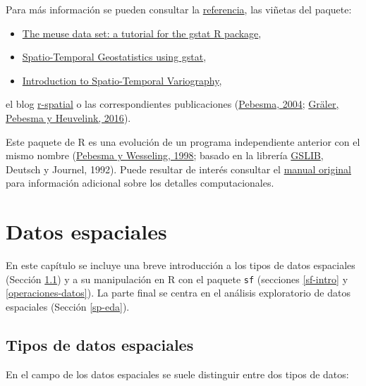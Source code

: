 \documentclass[
  spanish,
]{book}
\providecommand{\tightlist}{%
  \setlength{\itemsep}{0pt}\setlength{\parskip}{0pt}}
\theoremstyle{break}
\theoremstyle{definition}
\theoremstyle{definition}
\theoremstyle{definition}
\theoremstyle{definition}
\theoremstyle{remark}
\begin{document}
Para más información se pueden consultar la \href{https://r-spatial.github.io/gstat/reference/index.html}{referencia}, las viñetas del paquete:

\begin{itemize}
\tightlist
\item
  \href{https://cran.r-project.org/web/packages/gstat/vignettes/gstat.pdf}{The meuse data set: a tutorial for the gstat R package},
\item
  \href{https://cran.r-project.org/web/packages/gstat/vignettes/spatio-temporal-kriging.pdf}{Spatio-Temporal Geostatistics using gstat},
\item
  \href{https://cran.r-project.org/web/packages/gstat/vignettes/st.pdf}{Introduction to Spatio-Temporal Variography},
\end{itemize}

el blog \href{https://r-spatial.org/}{r-spatial} o las correspondientes publicaciones (\href{http://www.sciencedirect.com/science/article/pii/S0098300404000676}{Pebesma, 2004}; \href{https://journal.r-project.org/archive/2016-1/na-pebesma-heuvelink.pdf}{Gräler, Pebesma y Heuvelink, 2016}).

Este paquete de R es una evolución de un programa independiente anterior con el mismo nombre (\href{http://www.sciencedirect.com/science/article/pii/S0098300497000824}{Pebesma y Wesseling, 1998}; basado en la librería \href{http://www.gslib.com}{GSLIB}, Deutsch y Journel, 1992).
Puede resultar de interés consultar el \href{http://www.gstat.org/gstat.pdf}{manual original} para información adicional sobre los detalles computacionales.

\hypertarget{datos}{%
\chapter{Datos espaciales}\label{datos}}

En este capítulo se incluye una breve introducción a los tipos de datos espaciales (Sección \ref{datos-tipos}) y a su manipulación en R con el paquete \texttt{sf} (secciones \ref{sf-intro} y \ref{operaciones-datos}).
La parte final se centra en el análisis exploratorio de datos espaciales (Sección \ref{sp-eda}).

\hypertarget{datos-tipos}{%
\section{Tipos de datos espaciales}\label{datos-tipos}}

En el campo de los datos espaciales se suele distinguir entre dos tipos de datos:
\end{document}
